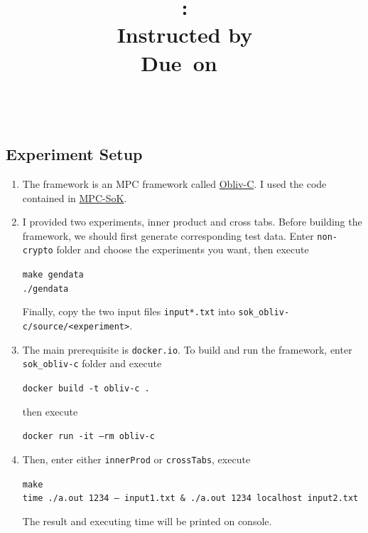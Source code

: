 \documentclass{article}
\title{\textmd{\bf \Class: \Title}\\{\large Instructed by \textit{\ClassInstructor}}\\\normalsize\vspace{0.1in}\small{Due\ on\ \DueDate}}
\date{}
\author{\textbf{\StudentName}\ \ \StudentClass\ \ \StudentNumber}
\begin{document}
\begin{spacing}{1.1}
\maketitle \thispagestyle{empty}

\section{Experiment Setup}

\begin{enumerate}

\item The framework is an MPC framework called
\href{https://github.com/samee/obliv-c}{Obliv-C}. I used the code contained in
\href{https://github.com/mpc-sok/frameworks}{MPC-SoK}.

\item I provided two experiments, inner product and cross tabs. Before building the
framework, we should first generate corresponding test data. Enter \texttt{non-crypto}
folder and choose the experiments you want, then execute
\begin{shaded}
\texttt{make gendata\\
./gendata}
\end{shaded}
Finally, copy the two input files \texttt{input*.txt} into
\texttt{sok\_obliv-c/source/<experiment>}.

\item The main prerequisite is \texttt{docker.io}. To build and run the framework, enter 
\texttt{sok\_obliv-c} folder and execute
\begin{shaded}
\texttt{docker build -t obliv-c .}
\end{shaded}
then execute
\begin{shaded}
\texttt{docker run -it --rm obliv-c}
\end{shaded}

\item 
Then, enter either \texttt{innerProd} or \texttt{crossTabs}, execute
\begin{shaded}
\texttt{make\\
time ./a.out 1234 -- input1.txt \& ./a.out 1234 localhost input2.txt}
\end{shaded}
The result and executing time will be printed on console.

\end{enumerate}



\end{spacing}
\end{document}
